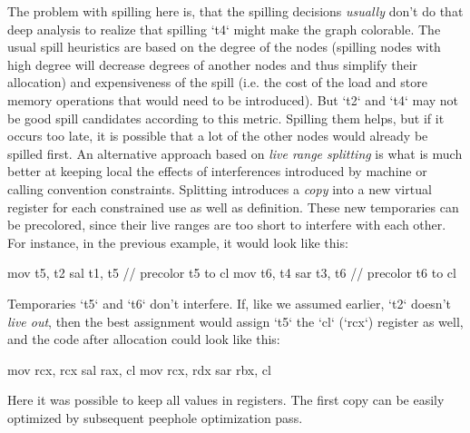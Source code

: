The problem with spilling here is, that the spilling decisions {\em usually}
don't do that deep analysis to realize that spilling `t4` might make the graph
colorable. The usual spill heuristics are based on the degree of the nodes
(spilling nodes with high degree will decrease degrees of another nodes and thus
simplify their allocation) and expensiveness of the spill (i.e. the cost of the
load and store memory operations that would need to be introduced). But `t2` and
`t4` may not be good spill candidates according to this metric. Spilling them
helps, but if it occurs too late, it is possible that a lot of the other nodes
would already be spilled first. An alternative approach based on {\em live range
splitting} is what is much better at keeping local the effects of interferences
introduced by machine or calling convention constraints. Splitting introduces a
{\em copy} into a new virtual register for each constrained use as well as
definition. These new temporaries can be precolored, since their live ranges are
too short to interfere with each other. For instance, in the previous example,
it would look like this:

\begtt
mov t5, t2
sal t1, t5 // precolor t5 to cl
mov t6, t4
sar t3, t6 // precolor t6 to cl
\endtt

Temporaries `t5` and `t6` don't interfere. If, like we assumed earlier, `t2`
doesn't {\em live out}, then the best assignment would assign `t5` the `cl`
(`rcx`) register as well, and the code after allocation could look like this:

\begtt
mov rcx, rcx
sal rax, cl
mov rcx, rdx
sar rbx, cl
\endtt

Here it was possible to keep all values in registers. The first copy can be
easily optimized by subsequent peephole optimization pass.

